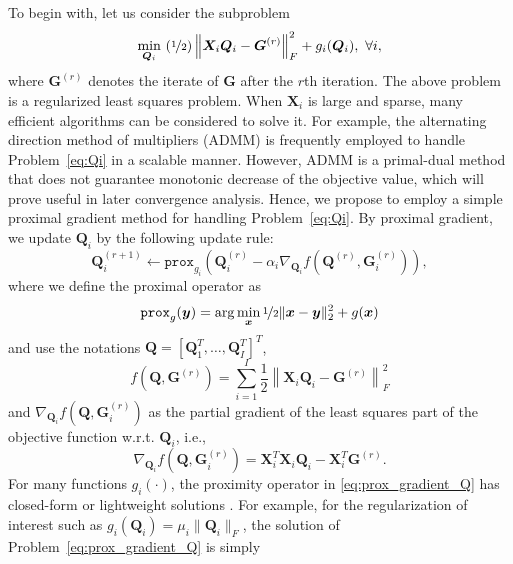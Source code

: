 \documentclass[10pt,journal]{IEEEtran}
\newcommand{\G}{\boldsymbol{G}}
\newcommand{\Q}{\boldsymbol{Q}}
\newcommand{\X}{\boldsymbol{X}}
\begin{document}
To begin with, let us consider the subproblem
\begin{equation}\label{eq:Qi}
\min_{{\bm Q}_i}~(\nicefrac{1}{2})\left\|{\bm X}_i{\bm Q}_i-{\bm G}^{(r)}\right\|_F^2+ g_i(\Q_i),~\forall i,
\end{equation}
where $\G^{(r)}$ denotes the iterate of $\G$ after the $r$th iteration.
The above problem is a regularized least squares problem. When $\X_i$ is large and sparse,
many efficient algorithms can be considered to solve it. 
For example, the alternating direction method of multipliers (ADMM) \cite{Boyd11} is frequently employed to handle Problem~\eqref{eq:Qi} in a scalable manner.
However, ADMM is a primal-dual method that does not guarantee monotonic decrease of the objective value, which will prove useful in later convergence analysis.
Hence, we propose to employ a simple proximal gradient method for handling Problem~\eqref{eq:Qi}. By proximal gradient, we update $\Q_i$ by the following update rule:
\begin{equation}\label{eq:prox_gradient_Q}
        {\bm Q}_i^{(r+1)} \leftarrow \texttt{prox}_{g_i}\left(\Q_i^{(r)}-\alpha_i \nabla_{\Q_i} f\left(\Q^{(r)},\G_i^{(r)}\right)\right),
\end{equation}
where we define the proximal operator as
\[\texttt{prox}_g({\bm y}) =\arg\min_{\bm x}\nicefrac{1}{2}\|{\bm x}-{\bm y}\|_2^2 + g({\bm x})\]
and use the notations $\Q=[\Q_1^T,\ldots,\Q_I^T]^T$,
\[f(\Q,\G^{(r)}) = \sum_{i=1}^I\frac{1}{2}\left\|{\bm X}_i{\bm Q}_i-{\bm G}^{(r)}\right\|_F^2\]
and $\nabla_{\Q_i} f(\Q,\G_i^{(r)})$ as the partial gradient of the least squares part of the objective function w.r.t. $\Q_i$, i.e.,
\begin{equation}\label{eq:grad_Q}
 \nabla_{\Q_i} f\left(\Q,\G_i^{(r)}\right)={\bm X}_i^T{\bm X}_i{\bm Q}_i- {\bm X}_i^T{\bm G}^{(r)}.
\end{equation}
For many functions $g_i(\cdot)$, the proximity operator in \eqref{eq:prox_gradient_Q} has closed-form or lightweight solutions \cite{parikh2013proximal}.
For example, for the regularization of interest such as $g_i(\Q_i)=\mu_i\|\Q_i\|_{F}$, the solution of Problem~\eqref{eq:prox_gradient_Q} is simply
\end{document}
